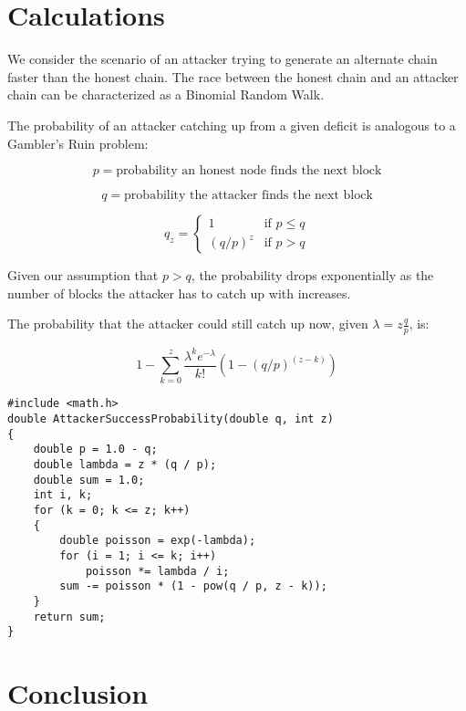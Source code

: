 \documentclass{article}
\begin{document}
\section{Calculations}

We consider the scenario of an attacker trying to generate an alternate chain faster than the honest chain. The race between the honest chain and an attacker chain can be characterized as a Binomial Random Walk.

The probability of an attacker catching up from a given deficit is analogous to a Gambler's Ruin problem:

\begin{equation}
p = \text{probability an honest node finds the next block}
\end{equation}

\begin{equation}
q = \text{probability the attacker finds the next block}
\end{equation}

\begin{equation}
q_z = \begin{cases}
1 & \text{if } p \leq q \\
(q/p)^z & \text{if } p > q
\end{cases}
\end{equation}

Given our assumption that $p > q$, the probability drops exponentially as the number of blocks the attacker has to catch up with increases.

The probability that the attacker could still catch up now, given $\lambda = z \frac{q}{p}$, is:

\begin{equation}
1 - \sum_{k=0}^{z} \frac{\lambda^k e^{-\lambda}}{k!} \left(1-(q/p)^{(z-k)}\right)
\end{equation}

\begin{verbatim}
#include <math.h>
double AttackerSuccessProbability(double q, int z)
{
    double p = 1.0 - q;
    double lambda = z * (q / p);
    double sum = 1.0;
    int i, k;
    for (k = 0; k <= z; k++)
    {
        double poisson = exp(-lambda);
        for (i = 1; i <= k; i++)
            poisson *= lambda / i;
        sum -= poisson * (1 - pow(q / p, z - k));
    }
    return sum;
}
\end{verbatim}

\section{Conclusion}
\end{document}
